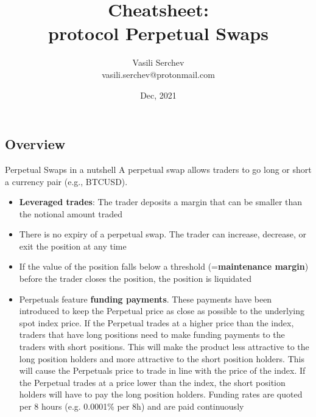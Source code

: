 \documentclass[10pt,a4paper]{article}
\title{\color{alert} Cheatsheet:\\ 
{\color{black} protocol Perpetual Swaps}}
\author{Vasili Serchev\\vasili.serchev@protonmail.com}
\date{Dec, 2021}
\begin{document}
\small
\begin{multicols}{3}

\maketitle
\thispagestyle{empty}
\scriptsize
\tableofcontents


\section{Overview}
\begin{textbox}{Perpetual Swaps in a nutshell}
A perpetual swap allows traders to go long or short a currency pair (e.g., BTCUSD).
\begin{itemize}
\item \textbf{Leveraged trades}: The trader deposits a margin that can be smaller than the notional amount traded
\item There is no expiry of a perpetual swap. The trader can increase, decrease, or exit the position at any time
\item If the value of the position falls below a threshold (=\textbf{maintenance margin})
before the trader closes the position, the position is liquidated
\item Perpetuals feature \textbf{funding payments}. These payments have been introduced to keep the Perpetual price as 
close as possible to the underlying spot index price.
If the Perpetual trades at a higher price than the index, traders that have long positions need to make funding payments 
to the traders with short positions. 
This will make the product less attractive to the long position holders and more attractive to the short position holders. 
This will cause the Perpetuals price 
to trade in line with the price of the index. If the Perpetual trades at a price lower than the index, the short position holders 
will have to pay the long position holders. Funding rates are quoted per 8 hours (e.g. 0.0001\% per
8h) and are paid continuously
\end{itemize}
\end{textbox}



\end{multicols}
\end{document}
